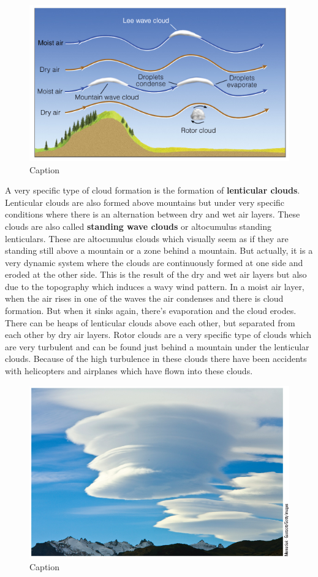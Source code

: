 \documentclass[12pt,oneside]{book}
\begin{document}
\begin{figure}

{\centering \includegraphics[width=0.9\linewidth]{figures/Figure321} 

}

\caption{Caption}\label{fig:Orographic}
\end{figure}

A very specific type of cloud formation is the formation of
\textbf{lenticular clouds}. Lenticular clouds are also formed above
mountains but under very specific conditions where there is an
alternation between dry and wet air layers. These clouds are also called
\textbf{standing wave clouds} or altocumulus standing lenticulars. These
are altocumulus clouds which visually seem as if they are standing still
above a mountain or a zone behind a mountain. But actually, it is a very
dynamic system where the clouds are continuously formed at one side and
eroded at the other side. This is the result of the dry and wet air
layers but also due to the topography which induces a wavy wind pattern.
In a moist air layer, when the air rises in one of the waves the air
condenses and there is cloud formation. But when it sinks again, there's
evaporation and the cloud erodes. There can be heaps of lenticular
clouds above each other, but separated from each other by dry air
layers. Rotor clouds are a very specific type of clouds which are very
turbulent and can be found just behind a mountain under the lenticular
clouds. Because of the high turbulence in these clouds there have been
accidents with helicopters and airplanes which have flown into these
clouds.

\begin{figure}

{\centering \includegraphics[width=0.7\linewidth]{figures/Figure322} 

}

\caption{Caption}\label{fig:Orographic2}
\end{figure}
\end{document}

